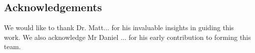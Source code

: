 \documentclass[isoft]{poster_class_UofC}
\begin{document}
\begin{poster}
        \section{Acknowledgements}
We would like to thank Dr. Matt... for his invaluable insights in guiding this work.  We also acknowledge Mr Daniel ... for his early contribution to forming this team.

        
        
    
    
    \end{poster}
\end{document}
